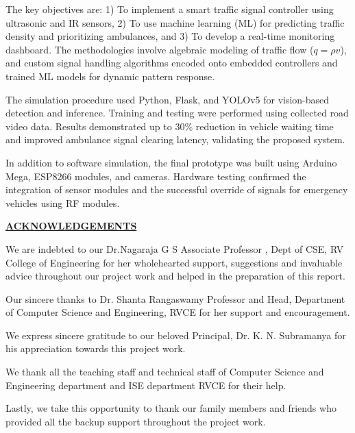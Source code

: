 \documentclass[12pt]{report}
\begin{document}
The key objectives are: 1) To implement a smart traffic signal controller using ultrasonic and IR sensors, 2) To use machine learning (ML) for predicting traffic density and prioritizing ambulances, and 3) To develop a real-time monitoring dashboard. The methodologies involve algebraic modeling of traffic flow ($q = \rho v$), and custom signal handling algorithms encoded onto embedded controllers and trained ML models for dynamic pattern response.

The simulation procedure used Python, Flask, and YOLOv5 for vision-based detection and inference. Training and testing were performed using collected road video data. Results demonstrated up to 30\% reduction in vehicle waiting time and improved ambulance signal clearing latency, validating the proposed system.

In addition to software simulation, the final prototype was built using Arduino Mega, ESP8266 modules, and cameras. Hardware testing confirmed the integration of sensor modules and the successful override of signals for emergency vehicles using RF modules.

\pagebreak

\thispagestyle{empty}

\begin{center}
\Large\textbf{\underline{ACKNOWLEDGEMENTS}} \par
\end{center}
We are indebted to our Dr.Nagaraja G S Associate Professor , Dept of CSE, RV College of 
Engineering for her wholehearted support, suggestions and invaluable advice throughout our 
project work and helped in the preparation of this report.  
 
Our sincere thanks to Dr. Shanta Rangaswamy Professor and Head, Department of Computer 
Science and Engineering, RVCE for her support and encouragement. 
 
We express sincere gratitude to our beloved Principal, Dr. K. N. Subramanya for his 
appreciation towards this project work. 
 
We thank all the teaching staff and technical staff of Computer Science and Engineering 
department and ISE department RVCE for their help.  
 
Lastly, we take this opportunity to thank our family members and friends who provided all the 
backup support throughout the project work. 
\end{document}
